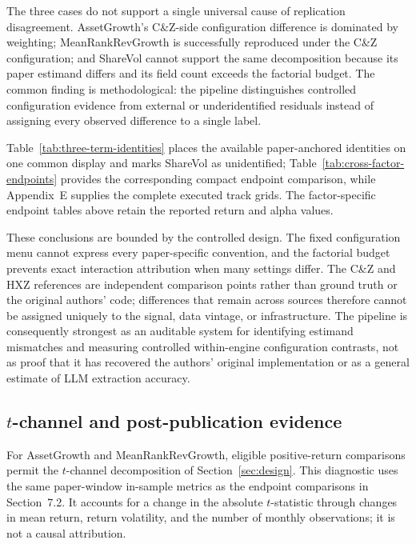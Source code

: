 The three cases do not support a single universal cause of replication
disagreement. AssetGrowth's C\&Z-side configuration difference is dominated
by weighting; MeanRankRevGrowth is successfully reproduced under the C\&Z
configuration; and ShareVol cannot support the
same decomposition because its paper estimand differs and its field count
exceeds the factorial budget. The common finding is methodological: the
pipeline distinguishes controlled configuration evidence from external or
underidentified residuals instead of assigning every observed difference to a
single label.

Table~\ref{tab:three-term-identities} places the available paper-anchored
identities on one common display and marks ShareVol as unidentified;
Table~\ref{tab:cross-factor-endpoints} provides the corresponding compact
endpoint comparison, while Appendix~E supplies the complete executed track
grids. The factor-specific endpoint tables above retain the reported return
and alpha values.

These conclusions are bounded by the controlled design. The fixed
configuration menu cannot express every paper-specific convention, and the
factorial budget prevents exact interaction attribution when many settings
differ. The C\&Z and HXZ references are independent comparison points rather
than ground truth or the original authors' code; differences that remain
across sources therefore cannot be assigned uniquely to the signal, data
vintage, or infrastructure. The pipeline is consequently strongest as an
auditable system for identifying estimand mismatches and measuring controlled
within-engine configuration contrasts, not as proof that it has recovered the
authors' original implementation or as a general estimate of LLM extraction
accuracy.


\subsection{$t$-channel and post-publication evidence}

For AssetGrowth and MeanRankRevGrowth, eligible positive-return comparisons
permit the $t$-channel decomposition of Section~\ref{sec:design}. This
diagnostic uses the same paper-window in-sample metrics as the endpoint
comparisons in Section~7.2. It accounts for a change in the absolute
$t$-statistic through changes in mean return, return volatility, and the
number of monthly observations; it is not a causal attribution.

